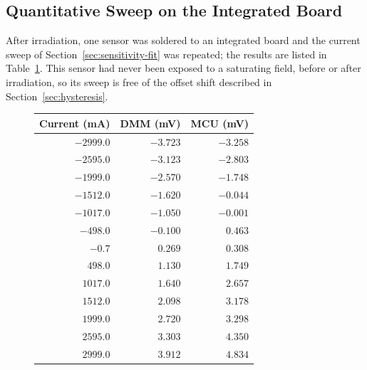 \documentclass[12pt,a4paper]{article}
\begin{document}
\subsection{Quantitative Sweep on the Integrated Board}
\label{sec:rad-sweep}

After irradiation, one sensor was soldered to an integrated board and the current sweep of Section~\ref{sec:sensitivity-fit} was repeated; the results are listed in Table~\ref{tab:sensitivity-irr}. This sensor had never been exposed to a saturating field, before or after irradiation, so its sweep is free of the offset shift described in Section~\ref{sec:hysteresis}.

\begin{figure}[H]
    \centering
    
    \begin{minipage}[c]{0.42\textwidth}
        \centering
        \small %
        \label{tab:sensitivity-irr}
        \begin{tabular}{@{}rrr@{}}
            \toprule
            Current (mA) & DMM (mV) & MCU (mV) \\
            \midrule
            \(-2999.0\) & \(-3.723\) & \(-3.258\) \\
            \(-2595.0\) & \(-3.123\) & \(-2.803\) \\
            \(-1999.0\) & \(-2.570\) & \(-1.748\) \\
            \(-1512.0\) & \(-1.620\) & \(-0.044\) \\
            \(-1017.0\) & \(-1.050\) & \(-0.001\) \\
            \(-498.0\) & \(-0.100\) & $0.463$ \\
            \(-0.7\) & $0.269$ & $0.308$ \\
            $498.0$ & $1.130$ & $1.749$ \\
            $1017.0$ & $1.640$ & $2.657$ \\
            $1512.0$ & $2.098$ & $3.178$ \\
            $1999.0$ & $2.720$ & $3.298$ \\
            $2595.0$ & $3.303$ & $4.350$ \\
            $2999.0$ & $3.912$ & $4.834$ \\
            \bottomrule
        \end{tabular}
    \end{minipage}%
    \hfill

\end{figure}
\end{document}
